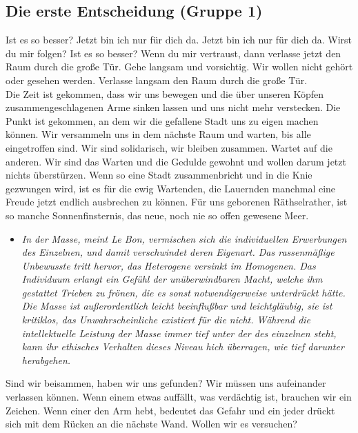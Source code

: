 \documentclass[a4paper, 12pt]{article}
\begin{document}
\subsection{Die erste Entscheidung (Gruppe 1)}
Ist es so besser? Jetzt bin ich nur für dich da.
Jetzt bin ich nur für dich da. Wirst du mir folgen? 
Ist es so besser?
Wenn du mir vertraust, dann verlasse jetzt den Raum durch die große Tür. 
Gehe langsam und vorsichtig. 
Wir wollen nicht gehört oder gesehen werden. 
Verlasse langsam den Raum durch die große Tür.\\
Die Zeit ist gekommen, dass wir uns bewegen und die über unseren Köpfen zusammengeschlagenen Arme sinken lassen und uns nicht mehr verstecken. 
Die Punkt ist gekommen, an dem wir die gefallene Stadt uns zu eigen machen können. 
Wir versammeln uns in dem nächste Raum und warten, bis alle eingetroffen sind.
Wir sind solidarisch, wir bleiben zusammen.
Wartet auf die anderen. Wir sind das Warten und die Gedulde gewohnt und wollen darum jetzt nichts überstürzen.
Wenn so eine Stadt zusammenbricht und in die Knie gezwungen wird, ist es für die ewig Wartenden, die Lauernden manchmal eine Freude jetzt endlich ausbrechen zu können. 
Für uns geborenen Räthselrather, ist so manche Sonnenfinsternis, das neue, noch nie so offen gewesene Meer. 
\begin{itemize}
    \item[] \textit{In der Masse, meint Le Bon, vermischen sich die individuellen Erwerbungen des Einzelnen, und damit verschwindet deren Eigenart. 
Das rassenmäßige Unbewusste tritt hervor, das Heterogene versinkt im Homogenen.
Das Individuum erlangt ein Gefühl der unüberwindbaren Macht, welche ihm gestattet Trieben zu frönen, die es sonst notwendigerweise unterdrückt hätte.
Die Masse ist außerordentlich leicht beeinflußbar und leichtgläubig, sie ist kritiklos, das Unwahrscheinliche existiert für die nicht.
Während die intellektuelle Leistung der Masse  immer tief unter der des einzelnen steht, kann ihr ethisches Verhalten dieses Niveau hich überragen, wie tief darunter herabgehen.}
\end{itemize}

Sind wir beisammen, haben wir uns gefunden? 
Wir müssen uns aufeinander verlassen können. 
Wenn einem etwas auffällt, was verdächtig ist, brauchen wir ein Zeichen.
Wenn einer den Arm hebt, bedeutet das Gefahr und ein jeder drückt sich mit dem Rücken an die nächste Wand. 
Wollen wir es versuchen? \\
\end{document}
